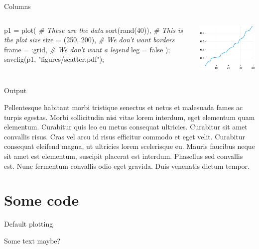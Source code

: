 \documentclass[11pt, compress, aspectratio=1610, serif]{beamer}
\newenvironment{Shaded}{}{}
\newcommand{\FloatTok}[1]{\textcolor[rgb]{0.25,0.63,0.44}{{#1}}}
\newcommand{\StringTok}[1]{\textcolor[rgb]{0.25,0.44,0.63}{{#1}}}
\newcommand{\CommentTok}[1]{\textcolor[rgb]{0.38,0.63,0.69}{\textit{{#1}}}}
\newcommand{\NormalTok}[1]{{#1}}
\newcommand{\begincols}{\begin{columns}}
\newcommand{\stopcols}{\end{columns}}
\begin{document}
\begin{frame}[fragile]{Columns}

\begincols
{}

\begin{Shaded}
\begin{Highlighting}[]
\NormalTok{p1 = plot(}
  \CommentTok{# These are the data}
  \NormalTok{sort(rand(}\FloatTok{40}\NormalTok{)),}
  \CommentTok{# This is the plot size}
  \NormalTok{size  = (}\FloatTok{250}\NormalTok{, }\FloatTok{200}\NormalTok{),}
  \CommentTok{# We don't want borders}
  \NormalTok{frame = :grid,}
  \CommentTok{# We don't want a legend}
  \NormalTok{leg   = false}
  \NormalTok{);}
\NormalTok{savefig(p1, }\StringTok{"figures/scatter.pdf"}\NormalTok{);}
\end{Highlighting}
\end{Shaded}

\hfill{}

\includegraphics[width=\columnwidth]{figures/scatter.pdf}

\stopcols

\end{frame}

\begin{frame}{Output}

Pellentesque habitant morbi tristique senectus et netus et malesuada
fames ac turpis egestas. Morbi sollicitudin nisi vitae lorem interdum,
eget elementum quam elementum. Curabitur quis leo eu metus consequat
ultricies. Curabitur sit amet convallis risus. Cras vel arcu id risus
efficitur commodo et eget velit. Curabitur consequat eleifend magna, ut
ultricies lorem scelerisque eu. Mauris faucibus neque sit amet est
elementum, suscipit placerat est interdum. Phasellus sed convallis est.
Nunc fermentum convallis odio eget gravida. Duis venenatis dictum
tempor.

\end{frame}

\section{Some code}\label{some-code}

\begin{frame}{Default plotting}

Some text maybe?

\end{frame}

\end{document}
